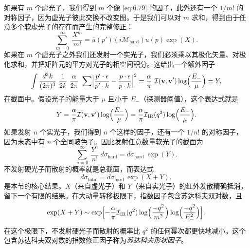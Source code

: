 如果有 $m$ 个虚光子，我们得到 $m$ 个像 \eqref{eq:6.79} 的因子，此外还有一个 $1/m!$ 的对称因子，因为虚光子彼此交换不改变图。于是我们可以对 $m$ 求和，得到由于任意多个软虚光子的存在而产生的完整修正：
\begin{equation}
  \sum_{m=0}^{\infty}\ \frac{X^m}{m!}
    = \bar{u}(p')(i\mathcal{M}_{\mathrm{hard}})u(p)\exp(X) .
  \label{eq:6.80}
\end{equation}
如果在 $m$ 个虚光子之外我们还发射一个实光子，我们必须乘以其极化矢量、对极化求和，并把矩阵元的平方对光子的相空间积分。这给出一个额外因子
\begin{equation}
  \int \frac{d^3k}{(2\pi)^3}\ \frac{1}{2k}\ \frac{\alpha}{2\pi}\ \sum
    \Bigl| \frac{p'\cdot\epsilon}{p'\cdot k} - \frac{p\cdot\epsilon}{p\cdot k}
      \Bigr|^2
  = \frac{\alpha}{\pi}\ \mathcal{I}(\mathbf{v},\mathbf{v}')\log\Bigl(
    \frac{E_{-}}{\mu} \Bigr)
  = Y ,
  \label{eq:6.81}
\end{equation}
在截面中。假设光子的能量大于 $\mu$ 且小于 $E_{-}$（探测器阈值），这个表达式就是
\begin{equation}
  Y = \frac{\alpha}{\pi}\mathcal{I}(\mathbf{v},\mathbf{v}')\log\Bigl(
    \frac{E_{-}}{\mu} \Bigr)
  = \frac{\alpha}{\pi}\mathcal{I}_{\mathrm{IR}}(q^2)\log\Bigl(
    \frac{E_{-}}{\mu} \Bigr) .
  \label{eq:6.82}
\end{equation}
如果发射 $n$ 个实光子，我们得到 $n$ 个这样的因子，还有一个 $1/n!$ 的对称因子，因为末态中有 $n$ 个全同玻色子。因此发射任意数量软光子的截面为
\begin{equation}
  \sum_{n=0}^{\infty}\ \frac{Y^n}{n!}\ d\sigma_{\mathrm{hard}}
    = d\sigma_{\mathrm{hard}}\ \exp(Y) .
  \label{eq:6.83}
\end{equation}
不发射硬光子而散射的概率就是总截面，而表达式
\begin{equation}
  d\sigma_{\mathrm{total}} = d\sigma_{\mathrm{hard}}\,
    \exp(X + Y) ,
  \label{eq:6.84}
\end{equation}
是本节的核心结果。$X$（来自虚光子）和 $Y$（来自实光子）的红外发散精确抵消，留下一个有限的结果。在大动量转移极限下，指数因子包含苏达科夫双对数，且
\begin{equation}
  \exp(X+Y) \sim \exp\Bigl[ -\frac{\alpha}{\pi}
    \mathcal{I}_{\mathrm{IR}}(q^2)\log\Bigl( \frac{-q^2}{m^2} \Bigr)
      \log\Bigl( \frac{-q^2}{E_{-}^2} \Bigr) \Bigr] .
  \label{eq:6.85}
\end{equation}
在这个极限下，不发射硬光子而散射的概率比 $q^2$ 的任何幂次都更快地减小。这个包含苏达科夫双对数的指数修正因子称为\emph{苏达科夫形状因子}。

